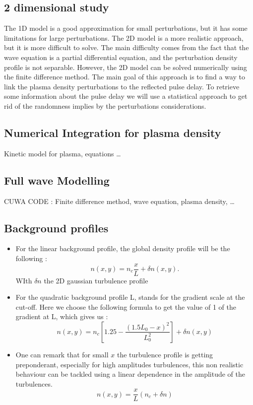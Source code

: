 \documentclass[11pt,a4paper]{report}
\begin{document}
\begin{multicols}{2}

    \section{2 dimensional study}
    The 1D model is a good approximation for small perturbations, but it has some limitations for large perturbations. The 2D model is a more realistic approach, but it is more difficult to solve. The main difficulty comes from the fact that the wave equation is a partial differential equation, and the perturbation density profile is not separable. However, the 2D model can be solved numerically using the finite difference method. The main goal of this approach is to find a way to link the plasma density perturbations to the reflected pulse delay. To retrieve some information about the pulse delay we will use a statistical approach to get rid of the randomness implies by the perturbations considerations.
    \subsection{Numerical Integration for plasma density}
    Kinetic model for plasma, equations \dots
    \subsection{Full wave Modelling}
    CUWA CODE : Finite difference method, wave equation, plasma density, \dots
    \subsection{Background profiles}
    \begin{itemize}
        \item For the linear background profile, the global density profile will be the following :
              $$n(x,y) = n_c \frac{x}{L} + \delta n(x,y).$$ WIth $\delta n $ the 2D gaussian turbulence profile
        \item For the quadratic background profile L, stands for the gradient scale at the cut-off. Here we choose the following formula to get the value of 1 of the gradient at L, which gives us :
              $$n(x,y) = n_c \left[1.25 - \frac{(1.5L_0 - x)^2}{L_0^2} \right] + \delta n (x,y)$$
        \item One can remark that for small $x$ the turbulence profile is getting preponderant, especially for high amplitudes turbulences, this non realistic behaviour can be
              tackled using a linear dependence in the amplitude of the turbulences. $$n(x,y) = \frac{x}{L}\left( n_c  + \delta n \right)$$
    \end{itemize}


\end{multicols}
\end{document}
